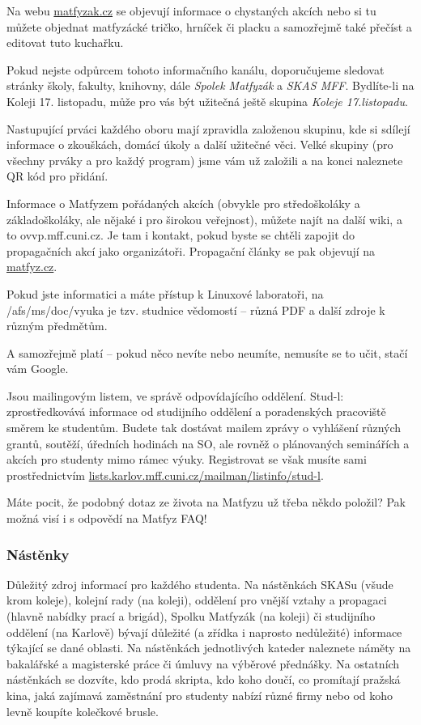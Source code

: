 Na webu \url{matfyzak.cz} se objevují informace o chystaných akcích nebo si tu
můžete objednat matfyzácké tričko, hrníček či placku a samozřejmě také přečíst a
editovat tuto kuchařku.


Pokud nejste odpůrcem tohoto informačního kanálu, doporučujeme sledovat stránky
školy, fakulty, knihovny, dále \textit{Spolek Matfyzák} a \textit{SKAS MFF}.
Bydlíte-li na Koleji 17. listopadu, může pro vás být užitečná ještě skupina
\textit{Koleje 17.listopadu}.

Nastupující prváci každého oboru mají zpravidla založenou skupinu, kde si
sdílejí informace o zkouškách, domácí úkoly a další užitečné věci. Velké skupiny
(pro všechny prváky a pro každý program) jsme vám už založili a na konci
naleznete QR kód pro přidání.


Informace o Matfyzem pořádaných akcích (obvykle pro středoškoláky a
základoškoláky, ale nějaké i pro širokou veřejnost), můžete najít na další wiki,
a to ovvp.mff.cuni.cz. Je tam i kontakt, pokud byste se chtěli zapojit do
propagačních akcí jako organizátoři. Propagační články se pak objevují na
\url{matfyz.cz}.

Pokud jste informatici a máte přístup k Linuxové laboratoři, na
/afs/ms/doc/vyuka je tzv. studnice vědomostí – různá PDF a další zdroje k různým
předmětům.

A samozřejmě platí – pokud něco nevíte nebo neumíte, nemusíte se to učit, stačí
vám Google.

Jsou mailingovým listem, ve správě odpovídajícího oddělení. Stud-l:
zprostředkovává informace od studijního oddělení a poradenských pracoviště
směrem ke studentům. Budete tak dostávat mailem zprávy o vyhlášení různých
grantů, soutěží, úředních hodinách na SO, ale rovněž o plánovaných seminářích a
akcích pro studenty mimo rámec výuky. Registrovat se však musíte sami
prostřednictvím \url{lists.karlov.mff.cuni.cz/mailman/listinfo/stud-l}.

Máte pocit, že podobný dotaz ze života na Matfyzu už třeba někdo položil? Pak
možná visí i s odpovědí na Matfyz FAQ!


\subsubsection{Nástěnky}
Důležitý zdroj informací pro každého studenta. Na nástěnkách SKASu (všude krom
koleje), kolejní rady (na koleji), oddělení pro vnější vztahy a propagaci
(hlavně nabídky prací a brigád), Spolku Matfyzák (na koleji) či studijního
oddělení (na Karlově) bývají důležité (a zřídka i naprosto nedůležité) informace
týkající se dané oblasti. Na nástěnkách jednotlivých kateder naleznete náměty na
bakalářské a magisterské práce či úmluvy na výběrové přednášky. Na ostatních
nástěnkách se dozvíte, kdo prodá skripta, kdo koho doučí, co promítají pražská
kina, jaká zajímavá zaměstnání pro studenty nabízí různé firmy nebo od koho
levně koupíte kolečkové brusle.


